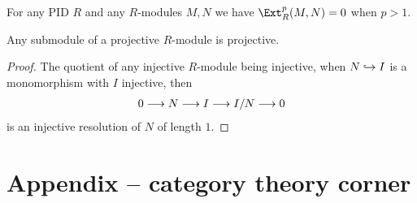 \documentclass[a4paper,parskip=half,numbers=enddot, DIV=12]{scrreprt}
\begin{document}
\begin{prop}
	\begin{alphanumerate}
		\item For any PID $R$ and any $R$-modules $M,N$ we have $\Ext_R^p(M,N)=0$ when $p>1$.
		\item Any submodule of a projective $R$-module is projective.
	\end{alphanumerate}
\end{prop}
\begin{proof}
	The quotient of any injective $R$-module being injective, when $N\monomorphism I$ is a monomorphism with $I$ injective, then
	\begin{align*}
		0\morphism N\morphism I\morphism I/N\morphism 0
	\end{align*}
	is an injective resolution of $N$ of length $1$.
\end{proof}

\appendix
\chapter{Appendix -- category theory corner}
\setcounter{thm}{0}
\renewcommand*{\thethm}{\Alph{thm}}
\end{document}
